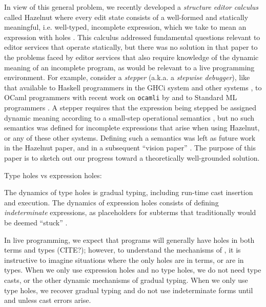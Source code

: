 In view of this general problem, we recently developed a \emph{structure editor calculus} called Hazelnut where every edit state consists of a well-formed and statically meaningful, i.e. well-typed, incomplete expression, which we take to mean an expression with holes \cite{popl-paper}. This calculus addressed fundamental questions relevant to editor services that operate statically, but there was no solution in that paper to the problems faced by editor services that also require knowledge of the dynamic meaning of an incomplete program, as would be relevant to a live programming environment. For example, consider a \emph{stepper} (a.k.a. a \emph{stepwise debugger}), like that available to Haskell programmers in the GHCi system \cite{GHC-stepper} and other systems \cite{DBLP:conf/haskell/MarlowIPG07,kar13566}, to OCaml programmers with recent work on \texttt{ocamli} by \citet{ocaml-stepper} and to Standard ML programmers \cite{DBLP:journals/jfp/TolmachA95}. A stepper requires that the expression being stepped be assigned dynamic meaning according to a small-step operational semantics \cite{DBLP:journals/jlp/Plotkin04a,pfpl}, but no such semantics was defined for incomplete expressions that arise when using Hazelnut, or any of these other systems. Defining such a semantics was left as future work in the Hazelnut paper, and in a subsequent ``vision paper'' \cite{snapl17-paper}. The purpose of this paper is to sketch out our progress toward a theoretically well-grounded solution.


Type holes vs expression holes: 

The dynamics of type holes is gradual typing, including run-time cast
insertion and execution.
%
The dynamics of expression holes consists of defining
\emph{indeterminate} expressions, as placeholders for subterms that
traditionally would be deemed ``stuck'' .

In live programming, we expect that programs will generally have holes
in both terms and types (CITE?); however, to understand the mechanisms
of \HazelnutLive, it is instructive to imagine situations where the
only holes are in terms, or are in types.
%
When we only use expression holes and no type holes, we do not need
type casts, or the other dynamic mechanisms of gradual typing.
% 
When we only use type holes, we recover gradual typing and do not use
indeterminate forms until and unless cast errors arise.


